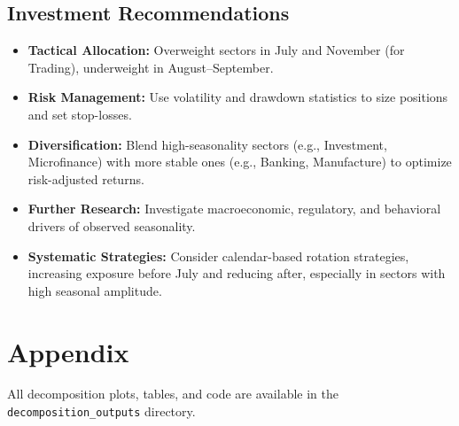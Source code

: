 \documentclass[12pt]{article}
\begin{document}
\subsection{Investment Recommendations}
\begin{itemize}
    \item \textbf{Tactical Allocation:} Overweight sectors in July and November (for Trading), underweight in August–September.
    \item \textbf{Risk Management:} Use volatility and drawdown statistics to size positions and set stop-losses.
    \item \textbf{Diversification:} Blend high-seasonality sectors (e.g., Investment, Microfinance) with more stable ones (e.g., Banking, Manufacture) to optimize risk-adjusted returns.
    \item \textbf{Further Research:} Investigate macroeconomic, regulatory, and behavioral drivers of observed seasonality.
    \item \textbf{Systematic Strategies:} Consider calendar-based rotation strategies, increasing exposure before July and reducing after, especially in sectors with high seasonal amplitude.
\end{itemize}

\section{Appendix}
All decomposition plots, tables, and code are available in the \texttt{decomposition\_outputs} directory.
\end{document}

